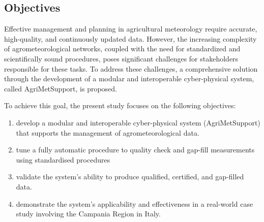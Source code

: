 \documentclass[authoryear,preprint,review,12pt]{elsarticle}
\begin{document}
\subsection{Objectives}
Effective management and planning in agricultural meteorology require accurate, high-quality, and continuously updated data.
However, the increasing complexity of agrometeorological networks, coupled with the need for standardized and scientifically sound procedures, poses significant challenges for stakeholders responsible for these tasks.
To address these challenges, a comprehensive solution through the development of a modular and interoperable cyber-physical system, called AgriMetSupport, is proposed.

To achieve this goal, the present study focuses on the following objectives:
\begin{enumerate}
    \item develop a modular and interoperable cyber-physical system (Agri\-Met\-Support) that supports the  management of agrometeorological data.
    \item tune a fully automatic procedure %
    to quality check and gap-fill measurements using standardised procedures %
    \item validate the system's ability to produce qualified, certified, and gap-filled data.
    \item demonstrate the system's applicability and effectiveness in a real-world case study involving the Campania Region in Italy.
\end{enumerate}

\end{document}
